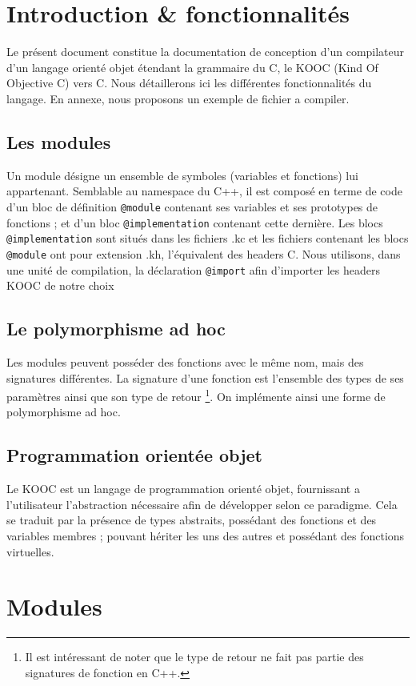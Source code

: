 \documentclass[12pt,a4paper]{article}
\def\code#1{\texttt{#1}}
\begin{document}
\begin{NoHyper}
  \tableofcontents
  \newpage
  \section{Introduction \& fonctionnalités}
  Le présent document constitue la documentation de conception d'un compilateur d'un langage orienté objet étendant la grammaire du C, le KOOC (Kind Of Objective C) vers C. Nous détaillerons ici les différentes fonctionnalités du langage. En annexe, nous proposons un exemple de fichier a compiler.
  \subsection{Les modules}
  Un module désigne un ensemble de symboles (variables et fonctions) lui appartenant. Semblable au namespace du C++, il est composé en terme de code d'un bloc de définition \code{@module} contenant ses variables et ses prototypes de fonctions ; et d'un bloc \code{@implementation} contenant cette dernière. Les blocs \code{@implementation} sont situés dans les fichiers .kc et les fichiers contenant les blocs \code{@module} ont pour extension .kh, l'équivalent des headers C. Nous utilisons, dans une unité de compilation, la déclaration \code{@import} afin d'importer les headers KOOC de notre choix
  \subsection{Le polymorphisme ad hoc}
  Les modules peuvent posséder des fonctions avec le même nom, mais des signatures différentes. La signature d'une fonction est l'ensemble des types de ses paramètres ainsi que son type de retour \footnote{Il est intéressant de noter que le type de retour ne fait pas partie des signatures de fonction en C++.}. On implémente ainsi une forme de polymorphisme ad hoc.
  \subsection{Programmation orientée objet}
  Le KOOC est un langage de programmation orienté objet, fournissant a l'utilisateur l'abstraction nécessaire afin de développer selon ce paradigme. Cela se traduit par la présence de types abstraits, possédant des fonctions et des variables membres ; pouvant hériter les uns des autres et possédant des fonctions virtuelles.

  \section{Modules}

\end{NoHyper}
\end{document}
